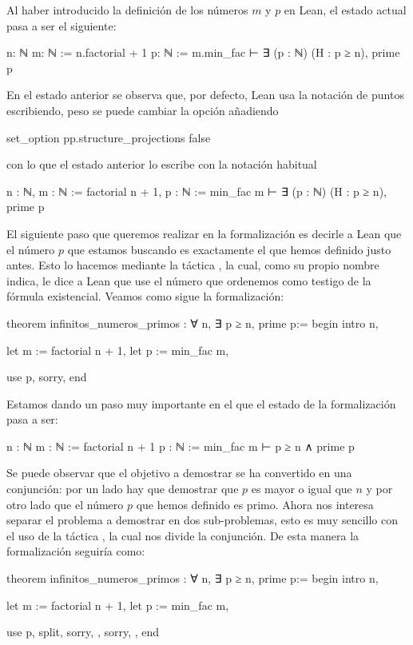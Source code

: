 Al haber introducido la definición de los números \(m\) y \(p\) en Lean,
el estado actual pasa a ser el siguiente:
\begin{leancode}
n: ℕ
m: ℕ := n.factorial + 1
p: ℕ := m.min_fac
⊢ ∃ (p : ℕ) (H : p ≥ n), prime p
\end{leancode}


En el estado anterior se observa que, por defecto, Lean usa la notación
de puntos escribiendo, peso se puede cambiar la opción añadiendo
\begin{leancode}
set_option pp.structure_projections false
\end{leancode}
con lo que el estado anterior lo escribe con la notación habitual
\begin{leancode}
n : ℕ,
m : ℕ := factorial n + 1,
p : ℕ := min_fac m
⊢ ∃ (p : ℕ) (H : p ≥ n), prime p
\end{leancode}

El siguiente paso que queremos realizar en la formalización es decirle a
Lean que el número \(p\) que estamos buscando es exactamente el que
hemos definido justo antes. Esto lo hacemos mediante la táctica
, la cual, como su propio nombre indica, le dice a
Lean que use el número que ordenemos como testigo de la fórmula
existencial. Veamos como sigue la formalización:

\begin{leancode}
theorem infinitos_numeros_primos : ∀ n, ∃ p ≥ n, prime p:=
begin
  intro n,

  let m := factorial n + 1,
  let p := min_fac m,

  use p,
  sorry,
end
\end{leancode}

Estamos dando un paso muy importante en el que el estado de la formalización
pasa a ser:
\begin{leancode}
n : ℕ
m : ℕ := factorial n + 1
p : ℕ := min_fac m
⊢ p ≥ n ∧ prime p
\end{leancode}

Se puede observar que el objetivo a demostrar se ha convertido en una
conjunción: por un lado hay que demostrar que \(p\) es mayor o igual que
\(n\) y por otro lado que el número \(p\) que hemos definido es primo. Ahora
nos interesa separar el problema a demostrar en dos sub-problemas, esto es
muy sencillo con el uso de la táctica , la cual nos
divide la conjunción. De esta manera la formalización seguiría como:
\begin{leancode}
theorem infinitos_numeros_primos : ∀ n, ∃ p ≥ n, prime p:=
begin
  intro n,

  let m := factorial n + 1,
  let p := min_fac m,

  use p,
  split,
  { sorry, },
  { sorry, },
end
\end{leancode}

